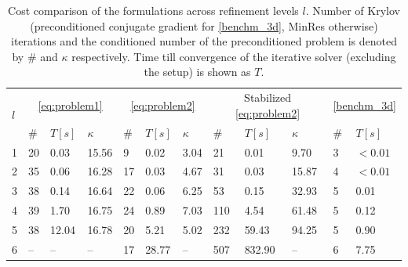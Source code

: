 \begin{table}
  \scriptsize{
  \begin{center}
    \begin{tabular}{l|lll|lll|lll|ll}
      \toprule
      \multirow{2}{*}{$l$} & \multicolumn{3}{c|}{\eqref{eq:problem1}} & \multicolumn{3}{c|}{\eqref{eq:problem2}} & \multicolumn{3}{c|}{ Stabilized \eqref{eq:problem2}} & \multicolumn{2}{c}{\eqref{benchm_3d}}\\
      \cline{2-12}
      & \# & $T\left[s\right]$ & $\kappa$ & \# & $T\left[s\right]$ & $\kappa$ & \# & $T\left[s\right]$ & $\kappa$ & \# & $T\left[s\right]$\\
      \hline
      1 & 20 & 0.03  & 15.56 & 9  & 0.02  & 3.04 & 21  & 0.01   & 9.70  &3 & $<0.01$\\ 
      2 & 35 & 0.06  & 16.28 & 17 & 0.03  & 4.67 & 31  & 0.03   & 15.87 &4 & $<0.01$\\ 
      3 & 38 & 0.14  & 16.64 & 22 & 0.06  & 6.25 & 53  & 0.15   & 32.93 &5 & 0.01   \\ 
      4 & 39 & 1.70  & 16.75 & 24 & 0.89  & 7.03 & 110 & 4.54   & 61.48 &5 & 0.12   \\ 
      5 & 38 & 12.04 & 16.78 & 20 & 5.21  & 5.02 & 232 & 59.43  & 94.25 &5 & 0.90  \\ 
      6 & -- & --    & --    & 17 & 28.77 & --   & 507 & 832.90 & --    &6 & 7.75  \\ 
      \bottomrule
    \end{tabular}
    \end{center}
    }
  \caption{Cost comparison of the formulations across refinement levels $l$.
    Number of Krylov (preconditioned conjugate gradient for \eqref{benchm_3d},
    MinRes otherwise) iterations and the conditioned number of the preconditioned
    problem is denoted by $\#$ and $\kappa$ respectively. Time till convergence
    of the iterative solver (excluding the setup) is shown as $T$. 
  }
\label{tab:cost}
\end{table}



